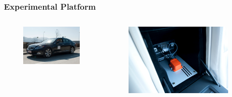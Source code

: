 \documentclass{beamer}
\begin{document}
	\begin{frame}
		\frametitle{Experimental Platform}
		\begin{columns}[t]
		  \begin{column}{5cm}
		  \begin{figure}[h]
			\center
			\includegraphics[scale=0.25]{../img/testbed:car}
		  \end{figure}	
		  \end{column}
		  
		  \begin{column}{5cm}
		  \begin{figure}[h]
			\center
			\includegraphics[scale=0.7]{../img/testbed:xsens}
		  \end{figure}   
		  \end{column}
		 \end{columns}			
		

\end{frame}
\end{document}
